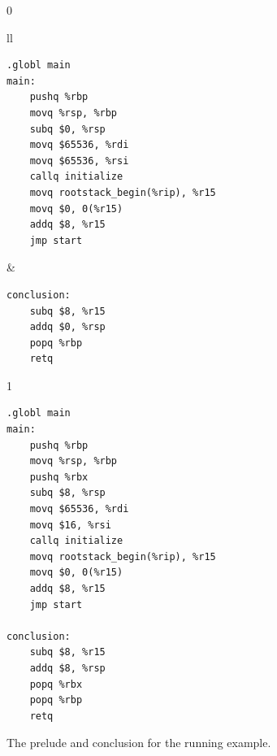 \documentclass[7x10]{TimesAPriori_MIT}%
\def\racketEd{0}
\def\pythonEd{1}
\def\edition{1}
\numberwithin{theorem}{chapter}
\numberwithin{definition}{chapter}
\numberwithin{equation}{chapter}
\begin{document}
\begin{figure}[htbp]
  \begin{tcolorbox}[colback=white]
{\if\edition\racketEd    
\begin{tabular}{ll}
\begin{minipage}[t]{0.45\textwidth}
\begin{lstlisting}[basicstyle=\ttfamily\footnotesize]
	.globl main
main:
    pushq %rbp
    movq %rsp, %rbp
    subq $0, %rsp
    movq $65536, %rdi
    movq $65536, %rsi
    callq initialize
    movq rootstack_begin(%rip), %r15
    movq $0, 0(%r15)
    addq $8, %r15
    jmp start
\end{lstlisting}
\end{minipage}
&
\begin{minipage}[t]{0.45\textwidth}
\begin{lstlisting}[basicstyle=\ttfamily\footnotesize]
conclusion:
    subq $8, %r15
    addq $0, %rsp
    popq %rbp
    retq
\end{lstlisting}
\end{minipage}
\end{tabular}
\fi}
{\if\edition\pythonEd    
\begin{minipage}[t]{0.5\textwidth}
\begin{lstlisting}[basicstyle=\ttfamily\footnotesize]
    .globl main
main:
    pushq %rbp
    movq %rsp, %rbp
    pushq %rbx
    subq $8, %rsp
    movq $65536, %rdi
    movq $16, %rsi
    callq initialize
    movq rootstack_begin(%rip), %r15
    movq $0, 0(%r15)
    addq $8, %r15
    jmp start

conclusion:
    subq $8, %r15
    addq $8, %rsp
    popq %rbx
    popq %rbp
    retq 
\end{lstlisting}
\end{minipage}
\fi}
  \end{tcolorbox}

  \caption{The prelude and conclusion for the running example.}
\label{fig:print-x86-output-gc}
\end{figure}
\end{document}
